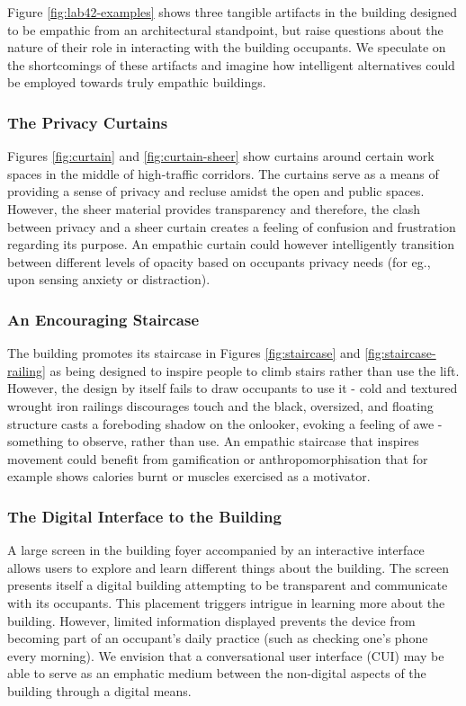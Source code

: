 \documentclass [sigconf, review, anonymous] {acmart}
\begin{document}
Figure \ref{fig:lab42-examples} shows three tangible artifacts in the building designed to be empathic from an architectural standpoint, but raise questions about the nature of their role in interacting with the building occupants. We speculate on the shortcomings of these artifacts and imagine how intelligent alternatives could be employed towards truly empathic buildings.

\subsubsection*{The Privacy Curtains}
Figures \ref{fig:curtain} and \ref{fig:curtain-sheer} show curtains around certain work spaces in the middle of high-traffic corridors. The curtains serve as a means of providing a sense of privacy and recluse amidst the open and public spaces. However, the sheer material provides transparency and therefore, the clash between privacy and a sheer curtain creates a feeling of confusion and frustration regarding its purpose. An empathic curtain could however intelligently transition between different levels of opacity based on occupants privacy needs (for eg., upon sensing anxiety or distraction).  

\subsubsection*{An Encouraging Staircase}
The building promotes its staircase in Figures \ref{fig:staircase} and \ref{fig:staircase-railing} as being designed to inspire people to climb stairs rather than use the lift. However, the design by itself fails to draw occupants to use it - cold and textured wrought iron railings discourages touch and the black, oversized, and floating structure casts a foreboding  shadow on the onlooker,  evoking a feeling of awe - something to observe, rather than use. An empathic staircase that inspires movement could benefit from gamification or anthropomorphisation that for example shows calories burnt or muscles exercised as a motivator. 

\subsubsection*{The Digital Interface to the Building}
A large screen in the building foyer accompanied by an interactive interface allows users to explore and learn different things about the building. The screen presents itself a digital building attempting to be transparent and communicate with its occupants. This placement triggers intrigue in learning more about the building. However, limited information displayed prevents the device from becoming part of an occupant's daily practice (such as checking one's phone every morning). We envision that a conversational user interface (CUI) may be able to serve as an emphatic medium between the non-digital aspects of the building through a digital means. 
\end{document}
